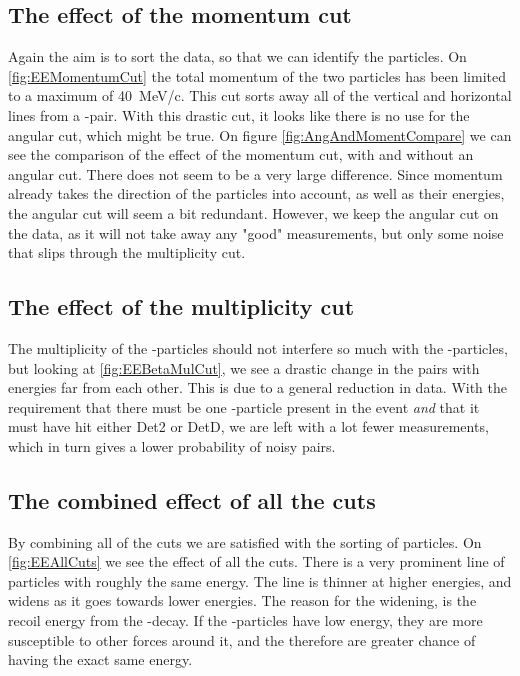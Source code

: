 \subsection{The effect of the momentum cut}
Again the aim is to sort the data, so that we can identify the particles. On \cref{fig:EEMomentumCut} the total momentum of the two particles has been limited to a maximum of \SI{40}{MeV/c}. This cut sorts away all of the vertical and horizontal lines from a \be-\al pair. With this drastic cut, it looks like there is no use for the angular cut, which might be true. On figure \ref{fig:AngAndMomentCompare} we can see the comparison of the effect of the momentum cut, with and without an angular cut. There does not seem to be a very large difference. Since momentum already takes the direction of the particles into account, as well as their energies, the angular cut will seem a bit redundant. However, we keep the angular cut on the data, as it will not take away any "good" measurements, but only some noise that slips through the multiplicity cut. 
 


\subsection{The effect of the multiplicity cut}
The multiplicity of the \be-particles should not interfere so much with the \al-particles, but looking at \cref{fig:EEBetaMulCut}, we see a drastic change in the pairs with energies far from each other. This is due to a general reduction in data. With the requirement that there must be one \be-particle present in the event \textit{and} that it must have hit either Det2 or DetD, we are left with a lot fewer measurements, which in turn gives a lower probability of noisy pairs. 

\subsection{The combined effect of all the cuts}
By combining all of the cuts we are satisfied with the sorting of particles. 
On \cref{fig:EEAllCuts} we see the effect of all the cuts.
There is a very prominent line of particles with roughly the same energy. 
The line is thinner at higher energies, and widens as it goes towards lower energies. 
The reason for the widening, is the recoil energy from the \be-decay.
If the \al-particles have low energy, they are more susceptible to other forces around it, and the therefore are greater chance of having the exact same energy.\\

